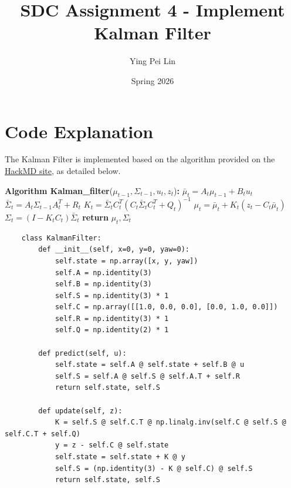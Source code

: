 \documentclass{article}
\begin{document}
\title{
  \textbf{SDC Assignment 4 - Implement Kalman Filter}
}
\author{Ying Pei Lin}
\date{Spring 2026}

\maketitle

\section{Code Explanation}

The Kalman Filter is implemented based on the algorithm provided on the \href{https://hackmd.io/zbrYma8NQQCiIFHNwKYpow?view}{HackMD site}, as detailed below.

\begin{algorithm}[H]
\caption{Kalman Filter}
\label{alg:kalman_filter}
\begin{algorithmic}[1]
\State \textbf{Algorithm Kalman\_filter}($\mu_{t-1}, \Sigma_{t-1}, u_t, z_t$)\textbf{:}
\State \quad $\bar{\mu}_t = A_t \mu_{t-1} + B_t u_t$
\State \quad $\bar{\Sigma}_t = A_t \Sigma_{t-1} A_t^T + R_t$
\State \quad $K_t = \bar{\Sigma}_t C_t^T (C_t \bar{\Sigma}_t C_t^T + Q_t)^{-1}$
\State \quad $\mu_t = \bar{\mu}_t + K_t (z_t - C_t \bar{\mu}_t)$
\State \quad $\Sigma_t = (I - K_t C_t) \bar{\Sigma}_t$
\State \quad \textbf{return} $\mu_t, \Sigma_t$
\end{algorithmic}
\end{algorithm}

\begin{listing}[H]
    \begin{verbatim}
    class KalmanFilter:
        def __init__(self, x=0, y=0, yaw=0):
            self.state = np.array([x, y, yaw])
            self.A = np.identity(3)
            self.B = np.identity(3)
            self.S = np.identity(3) * 1
            self.C = np.array([[1.0, 0.0, 0.0], [0.0, 1.0, 0.0]])
            self.R = np.identity(3) * 1
            self.Q = np.identity(2) * 1

        def predict(self, u):
            self.state = self.A @ self.state + self.B @ u
            self.S = self.A @ self.S @ self.A.T + self.R
            return self.state, self.S

        def update(self, z):
            K = self.S @ self.C.T @ np.linalg.inv(self.C @ self.S @ self.C.T + self.Q)
            y = z - self.C @ self.state
            self.state = self.state + K @ y
            self.S = (np.identity(3) - K @ self.C) @ self.S
            return self.state, self.S
    \end{verbatim}
    \caption{Python implementation of Kalman Filter}
    \label{lst:kalman_filter}
\end{listing}
\end{document}

